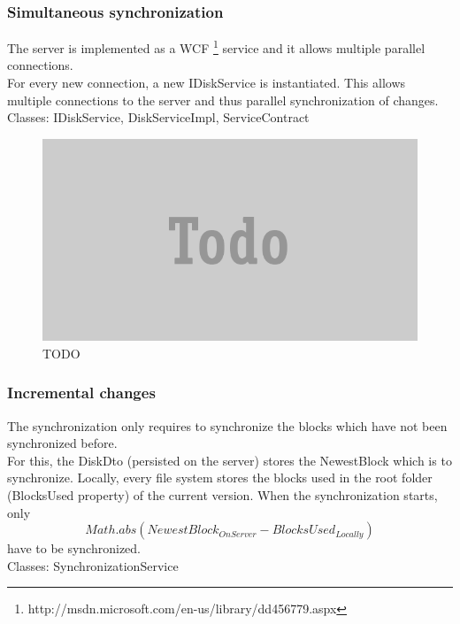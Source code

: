 \documentclass[JCDReport.tex]{subfiles}
\begin{document}
\subsubsection{Simultaneous synchronization}
The server is implemented as a WCF \footnote{http://msdn.microsoft.com/en-us/library/dd456779.aspx} service  and it allows multiple parallel connections.\\
For every new connection, a new IDiskService is instantiated. This allows multiple connections to the server and thus parallel synchronization of changes.\\
Classes: IDiskService, DiskServiceImpl, ServiceContract
\begin{figure}[h!]
	\centering
	\includegraphics[scale=1]{Images/todo.png} 
	\caption{TODO}
\end{figure}

\subsubsection{Incremental changes}
The synchronization only requires to synchronize the blocks which have not been synchronized before.\\
For this, the DiskDto (persisted on the server) stores the NewestBlock which is to synchronize. Locally, every file system stores the blocks used in the root folder (BlocksUsed property) of the current version. When the synchronization starts, only $$Math.abs(NewestBlock_{OnServer}-BlocksUsed_{Locally})$$ have to be synchronized.\\
Classes: SynchronizationService
\end{document}
